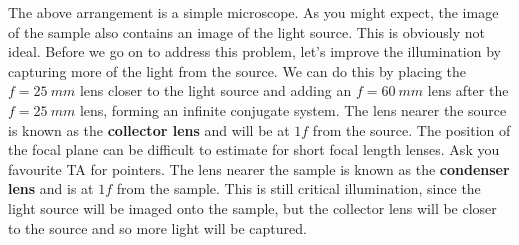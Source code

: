 \documentclass[a4paper]{report}
\begin{document}

The above arrangement is a simple microscope. 
As you might expect, the image of the sample also contains an image of the light source. 
This is obviously not ideal.
Before we go on to address this problem, let's improve the illumination by capturing more of the light from the source. 
We can do this by placing the $f=25~mm$ lens closer to the light source and adding an $f=60~mm$ lens after the $f=25~mm$ lens, forming an infinite conjugate system. 
The lens nearer the source is known as the \textbf{collector lens} and will be at $1f$ from the source. The position of the focal plane can be difficult to estimate for short focal length lenses. Ask you favourite TA for pointers.
The lens nearer the sample is known as the \textbf{condenser lens} and is at $1f$ from the sample. 
This is still critical illumination, since the light source will be imaged onto the sample, but the collector lens will be closer to the source and so more light will be captured.
\end{document}
